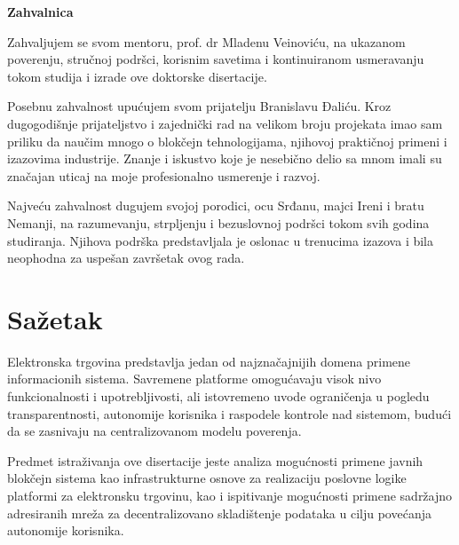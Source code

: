 

\cleardoublepage
\thispagestyle{empty}

\vspace*{3cm}

\begin{center}
{\Large\bfseries Zahvalnica}
\end{center}

\vspace{.5cm}

Zahvaljujem se svom mentoru, prof. dr Mladenu Veinoviću, na ukazanom poverenju, stručnoj podršci, korisnim savetima i kontinuiranom usmeravanju tokom studija i izrade ove doktorske disertacije.

\vspace{.5cm}

Posebnu zahvalnost upućujem svom prijatelju Branislavu Đaliću. Kroz dugogodišnje prijateljstvo i zajednički rad na velikom broju projekata imao sam priliku da naučim mnogo o blokčejn tehnologijama, njihovoj praktičnoj primeni i izazovima industrije. Znanje i iskustvo koje je nesebično delio sa mnom imali su značajan uticaj na moje profesionalno usmerenje i razvoj.

\vspace{.5cm}

Najveću zahvalnost dugujem svojoj porodici, ocu Srđanu, majci Ireni i bratu Nemanji, na razumevanju, strpljenju i bezuslovnoj podršci tokom svih godina studiranja. Njihova podrška predstavljala je oslonac u trenucima izazova i bila neophodna za uspešan završetak ovog rada.

\vspace{2cm}

\vfill

\newpage

\section*{Sažetak}
Elektronska trgovina predstavlja jedan od najznačajnijih domena primene informacionih sistema. Savremene platforme omogućavaju visok nivo funkcionalnosti i upotrebljivosti, ali istovremeno uvode ograničenja u pogledu transparentnosti, autonomije korisnika i raspodele kontrole nad sistemom, budući da se zasnivaju na centralizovanom modelu poverenja.

Predmet istraživanja ove disertacije jeste analiza mogućnosti primene javnih blokčejn sistema kao infrastrukturne osnove za realizaciju poslovne logike platformi za elektronsku trgovinu, kao i ispitivanje mogućnosti primene sadržajno adresiranih mreža za decentralizovano skladištenje podataka u cilju povećanja autonomije korisnika.

